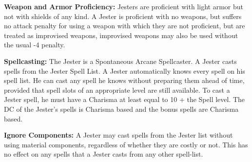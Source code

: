 \begin{minorcastingclasstable}
\end{minorcastingclasstable}

\classfeatures

\textbf{Weapon and Armor Proficiency:} Jesters are proficient with light armor but not with shields of any kind. A Jester is proficient with no weapons, but suffers no attack penalty for using a weapon with which they are not proficient, but are treated as improvised weapons, improvised weapons may also be used without the usual -4 penalty.

\textbf{Spellcasting:} The Jester is a Spontaneous Arcane Spellcaster. A Jester casts spells from the Jester Spell List. A Jester automatically knows every spell on his spell list. He can cast any spell he knows without preparing them ahead of time, provided that spell slots of an appropriate level are still available. To cast a Jester spell, he must have a Charisma at least equal to 10 + the Spell level. The DC of the Jester's spells is Charisma based and the bonus spells are Charisma based.

\textbf{Ignore Components:} A Jester may cast spells from the Jester list without using material components, regardless of whether they are costly or not. This has no effect on any spells that a Jester casts from any other spell-list.

